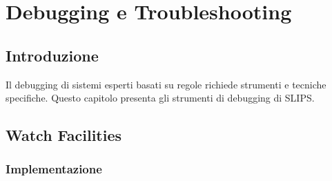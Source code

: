 
\chapter{Debugging e Troubleshooting}
\label{cap:debugging}

\section{Introduzione}

Il debugging di sistemi esperti basati su regole richiede strumenti e tecniche specifiche. Questo capitolo presenta gli strumenti di debugging di SLIPS.

\section{Watch Facilities}

\subsection{Implementazione}


